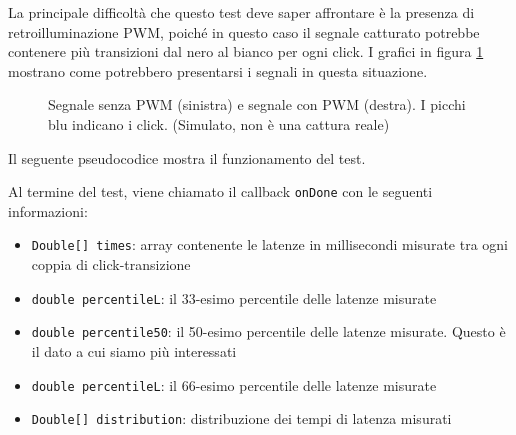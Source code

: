 La principale difficoltà che questo test deve saper affrontare è la presenza di retroilluminazione PWM, poiché in questo caso il segnale catturato potrebbe contenere più transizioni dal nero al bianco per ogni click. I grafici in figura \ref{fig:inputLagTest_example} mostrano come potrebbero presentarsi i segnali in questa situazione.
\begin{figure}[H]
	\centering
	\caption{Segnale senza PWM (sinistra) e segnale con PWM (destra). I picchi blu indicano i click. (Simulato, non è una cattura reale)}
	\label{fig:inputLagTest_example}
\end{figure}

Il seguente pseudocodice mostra il funzionamento del test.


Al termine del test, viene chiamato il callback \texttt{onDone} con le seguenti informazioni:\begin{itemize}
	\item \texttt{Double[] times}: array contenente le latenze in millisecondi misurate tra ogni coppia di click-transizione
	\item \texttt{double percentileL}: il 33-esimo percentile delle latenze misurate
	\item \texttt{double percentile50}: il 50-esimo percentile delle latenze misurate. Questo è il dato a cui siamo più interessati
	\item \texttt{double percentileL}: il 66-esimo percentile delle latenze misurate
	\item \texttt{Double[] distribution}: distribuzione dei tempi di latenza misurati
\end{itemize}

